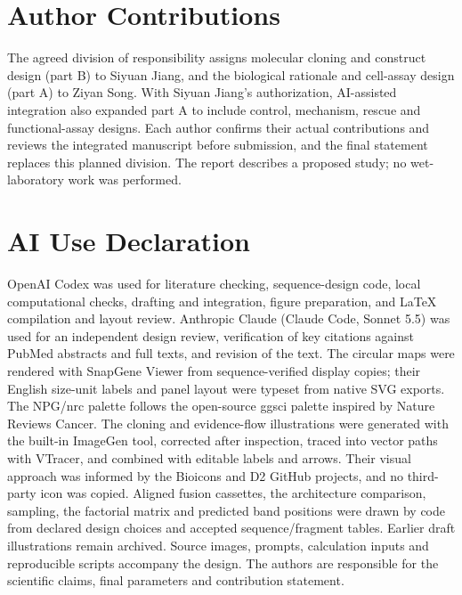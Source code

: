 \section*{Author Contributions}
The agreed division of responsibility assigns molecular cloning and construct design (part B) to Siyuan Jiang, and the biological rationale and cell-assay design (part A) to Ziyan Song. With Siyuan Jiang's authorization, AI-assisted integration also expanded part A to include control, mechanism, rescue and functional-assay designs. Each author confirms their actual contributions and reviews the integrated manuscript before submission, and the final statement replaces this planned division. The report describes a proposed study; no wet-laboratory work was performed.

\section*{AI Use Declaration}
OpenAI Codex was used for literature checking, sequence-design code, local computational checks, drafting and integration, figure preparation, and LaTeX compilation and layout review. Anthropic Claude (Claude Code, Sonnet 5.5) was used for an independent design review, verification of key citations against PubMed abstracts and full texts, and revision of the text. The circular maps were rendered with SnapGene Viewer from sequence-verified display copies; their English size-unit labels and panel layout were typeset from native SVG exports. The NPG/nrc palette follows the open-source ggsci palette inspired by Nature Reviews Cancer. The cloning and evidence-flow illustrations were generated with the built-in ImageGen tool, corrected after inspection, traced into vector paths with VTracer, and combined with editable labels and arrows. Their visual approach was informed by the Bioicons and D2 GitHub projects, and no third-party icon was copied. Aligned fusion cassettes, the architecture comparison, sampling, the factorial matrix and predicted band positions were drawn by code from declared design choices and accepted sequence/fragment tables. Earlier draft illustrations remain archived. Source images, prompts, calculation inputs and reproducible scripts accompany the design. The authors are responsible for the scientific claims, final parameters and contribution statement.
